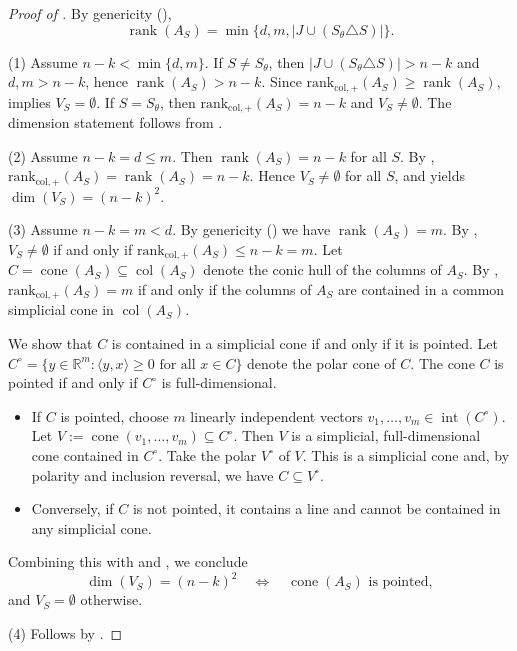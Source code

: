\documentclass{article}
\theoremstyle{definition}
\DeclareMathOperator{\rank}{rank}
\newcommand{\nncr}[1]{\mathrm{rank}_{\mathrm{col},+}(#1)}
\newcommand{\cone}{\operatorname{cone}}
\newcommand{\col}{\operatorname{col}}
\begin{document}
\begin{proof}[Proof of ]
By genericity (),
\[
\rank(A_S)=\min\{d,m, |J\cup (S_\theta \triangle S)|\}. 
\]

\medskip
\noindent
(1) Assume $n-k<\min\{d,m\}$. 
If $S\neq S_\theta$, then $|J\cup(S_\theta \triangle S)|>n-k$ and $d,m> n-k$, 
hence 
$\rank(A_S)>n-k$. 
Since $\nncr{A_S}\ge \rank(A_S)$, 
 implies $V_S=\emptyset$. 
If $S=S_\theta$, then 
$\nncr{A_S}=n-k$ and $V_S\neq\emptyset$. 
The dimension statement follows from 
.

\medskip
\noindent
(2) Assume $n-k=d\le m$. Then $\rank(A_S)=n-k$ for all $S$. 
By , 
$\nncr{A_S}=\rank(A_S)=n-k$. 
Hence $V_S\neq\emptyset$ for all $S$, and 
 yields 
$\dim(V_S)=(n-k)^2$. 

\medskip
\noindent
(3) 
Assume $n-k = m<d$. 
By genericity () we have $\rank(A_S) = m$. 
By ,
$V_S \neq \emptyset$ if and only if $\nncr{A_S} \le n-k = m$.  
Let $C = \cone(A_S) \subseteq \col(A_S)$ denote the conic hull of the columns of $A_S$. By , $\nncr{A_S} = m$ if and only if the columns of $A_S$ are contained in a common simplicial cone in $\col(A_S)$. 

We show that $C$ is contained in a simplicial cone if and only if it is pointed.  
 Let $C^\circ = \{y \in \mathbb{R}^m : \langle y, x \rangle \ge 0 \text{ for all } x \in C\}$ denote the polar cone of $C$. 
 The cone $C$ is pointed if and only if $C^\circ$ is full-dimensional. 
 \begin{itemize}[leftmargin=*]
     \item 
 If $C$ is pointed, choose $m$ linearly independent vectors $v_1,\dots,v_m \in \operatorname{int}(C^\circ)$. Let $V := \cone(v_1,\dots,v_m) \subseteq C^\circ$. Then $V$ is a simplicial, full-dimensional cone contained in $C^\circ$. 
Take the polar $V^\circ$ of $V$. This is a simplicial cone and, by polarity and inclusion reversal, we have $C \subseteq V^\circ$.  
\item 
Conversely, if $C$ is not pointed, it contains a line and cannot be contained in any simplicial cone.  
 \end{itemize}
%
Combining this with  and , we conclude
\[
\dim(V_S) = (n-k)^2 \quad \Longleftrightarrow \quad \cone(A_S) \text{ is pointed}, 
\]  
and $V_S = \emptyset$ otherwise.

\medskip
\noindent
(4) Follows by .
\end{proof}
\end{document}
